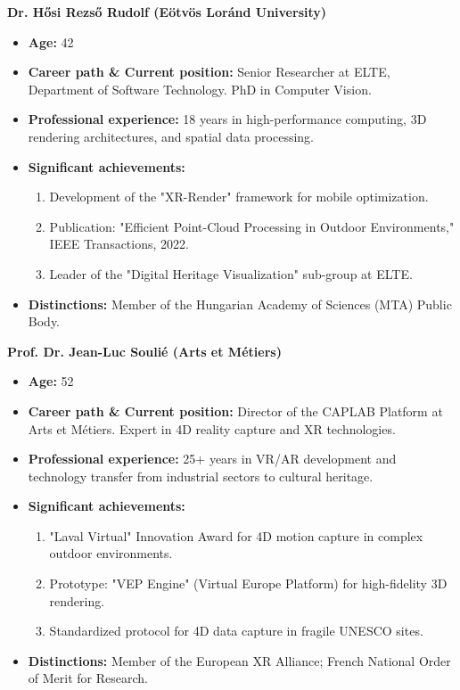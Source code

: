 \textbf{Dr. Hősi Rezső Rudolf (Eötvös Loránd University)}
\begin{itemize}
  \item \textbf{Age:} 42
  \item \textbf{Career path \& Current position:} Senior Researcher at ELTE, Department of Software Technology. PhD in Computer Vision.
  \item \textbf{Professional experience:} 18 years in high-performance computing, 3D rendering architectures, and spatial data processing.
  \item \textbf{Significant achievements:}
    \begin{enumerate}
      \item Development of the "XR-Render" framework for mobile optimization.
      \item Publication: "Efficient Point-Cloud Processing in Outdoor Environments," IEEE Transactions, 2022.
      \item Leader of the "Digital Heritage Visualization" sub-group at ELTE.
    \end{enumerate}
  \item \textbf{Distinctions:} Member of the Hungarian Academy of Sciences (MTA) Public Body.
\end{itemize}

\textbf{Prof. Dr. Jean-Luc Soulié (Arts et Métiers)}
\begin{itemize}
  \item \textbf{Age:} 52
  \item \textbf{Career path \& Current position:} Director of the CAPLAB Platform at Arts et Métiers. Expert in 4D reality capture and XR technologies.
  \item \textbf{Professional experience:} 25+ years in VR/AR development and technology transfer from industrial sectors to cultural heritage.
  \item \textbf{Significant achievements:}
    \begin{enumerate}
      \item "Laval Virtual" Innovation Award for 4D motion capture in complex outdoor environments.
      \item Prototype: "VEP Engine" (Virtual Europe Platform) for high-fidelity 3D rendering.
      \item Standardized protocol for 4D data capture in fragile UNESCO sites.
    \end{enumerate}
  \item \textbf{Distinctions:} Member of the European XR Alliance; French National Order of Merit for Research.
\end{itemize}

